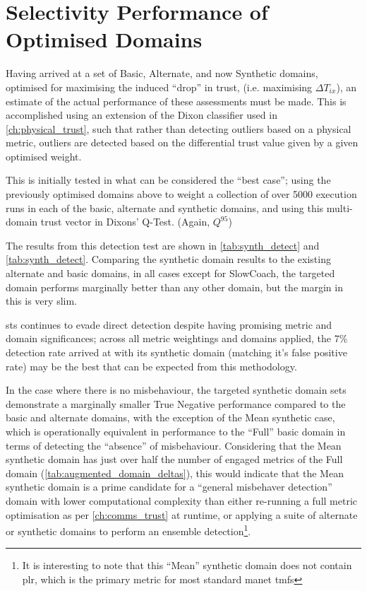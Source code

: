 \section{Selectivity Performance of Optimised Domains}

Having arrived at a set of Basic, Alternate, and now Synthetic domains, optimised for maximising the induced ``drop'' in trust, (i.e. maximising $\Delta T_{ix}$), an estimate of the actual performance of these assessments must be made.
This is accomplished using an extension of the Dixon classifier used in \autoref{ch:physical_trust}, such that rather than detecting outliers based on a physical metric, outliers are detected based on the differential trust value given by a given optimised weight.

This is initially tested in what can be considered the ``best case''; using the previously optimised domains above to weight a collection of over 5000 execution runs in each of the basic, alternate and synthetic domains, and using this multi-domain trust vector in Dixons' Q-Test. (Again, $Q^{95}$)

The results from this detection test are shown in \autoref{tab:synth_detect} and \autoref{tab:synth_detect}.
Comparing the synthetic domain results to the existing alternate and basic domains, in all cases except for SlowCoach, the targeted domain performs marginally better than any other domain, but the margin in this is very slim.

\gls{sts} continues to evade direct detection despite having promising metric and domain significances; across all metric weightings and domains applied, the 7\% detection rate arrived at with its synthetic domain (matching it's false positive rate) may be the best that can be expected from this methodology.

In the case where there is no misbehaviour, the targeted synthetic domain sets demonstrate a marginally smaller True Negative performance compared to the basic and alternate domains, with the exception of the Mean synthetic case, which is operationally equivalent in performance to the ``Full'' basic domain in terms of detecting the ``absence'' of misbehaviour. 
Considering that the Mean synthetic domain has just over half the number of engaged metrics of the Full domain (\autoref{tab:augmented_domain_deltas}), this would indicate that the Mean synthetic domain is a prime candidate for a ``general misbehaver detection'' domain with lower computational complexity than either re-running a full metric optimisation as per \autoref{ch:comms_trust} at runtime, or applying a suite of alternate or synthetic domains to perform an ensemble detection\footnote{It is interesting to note that this ``Mean'' synthetic domain does not contain \gls{plr}, which is the primary metric for most standard \gls{manet} \glspl{tmf}}.

